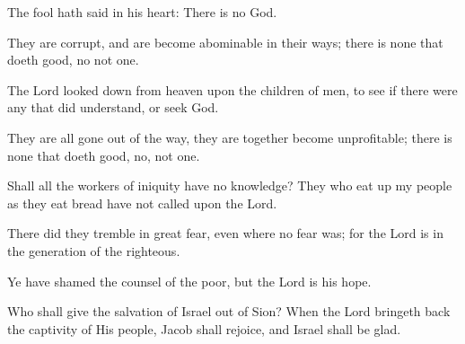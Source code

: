 The fool hath said in his heart: There is no God.

They are corrupt, and are become abominable in their ways; there is none that doeth good, no not one.

The Lord looked down from heaven upon the children of men, to see if there were any that did understand, or seek God.

They are all gone out of the way, they are together become unprofitable; there is none that doeth good, no, not one.

Shall all the workers of iniquity have no knowledge? They who eat up my people as they eat bread have not called upon the Lord.

There did they tremble in great fear, even where no fear was; for the Lord is in the generation of the righteous.

Ye have shamed the counsel of the poor, but the Lord is his hope.

Who shall give the salvation of Israel out of Sion? When the Lord bringeth back the captivity of His people, Jacob shall rejoice, and Israel shall be glad.
